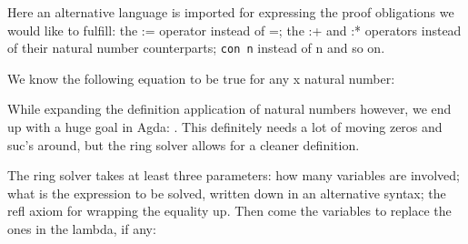 {Here an alternative language is imported for expressing the proof obligations we would like to fulfill: the := operator instead of =; the :+ and :* operators instead of their natural number counterparts; \texttt{con n} instead of n and so on.

We know the following equation to be true for any x natural number:

\begin{code}%
\>[0]\AgdaSpace{}%
\AgdaSymbol{:}\AgdaSpace{}%
\AgdaSymbol{(}\AgdaSpace{}%
\AgdaSymbol{:}\AgdaSpace{}%
\AgdaSymbol{)}\AgdaSpace{}%
\AgdaSpace{}%
\AgdaSymbol{(}\AgdaSpace{}%
\AgdaOperator{\AgdaPrimitive{*}}\AgdaSpace{}%
\AgdaSymbol{(}\AgdaSpace{}%
\AgdaOperator{\AgdaPrimitive{+}}\AgdaSpace{}%
\AgdaSymbol{)}\AgdaSpace{}%
\AgdaSpace{}%
\AgdaSpace{}%
\AgdaOperator{\AgdaPrimitive{+}}\AgdaSpace{}%
\AgdaSpace{}%
\AgdaOperator{\AgdaPrimitive{*}}\AgdaSpace{}%
\AgdaSymbol{)}\<%
\end{code}

While expanding the definition application of natural numbers however, we end up with a huge goal in Agda: . This definitely needs a lot of moving zeros and suc's around, but the ring solver allows for a cleaner definition.

The ring solver takes at least three parameters: how many variables are involved; what is the expression to be solved, written down in an alternative syntax; the refl axiom for wrapping the equality up. Then come the variables to replace the ones in the lambda, if any:
\begin{code}%
\>[0]\AgdaSpace{}%
\AgdaSymbol{=}\AgdaSpace{}%
\AgdaSpace{}%
\AgdaSpace{}%
\AgdaSpace{}%
\AgdaSpace{}%
\AgdaSpace{}%
\AgdaSpace{}%
\AgdaSpace{}%
\AgdaOperator{\AgdaFunction{:*}}\AgdaSpace{}%
\AgdaSymbol{(}\AgdaSpace{}%
\AgdaOperator{\AgdaFunction{:+}}\AgdaSpace{}%
\AgdaSpace{}%
\AgdaSymbol{)}\AgdaSpace{}%
\AgdaOperator{\AgdaFunction{:=}}\AgdaSpace{}%
\AgdaSpace{}%
\AgdaSpace{}%
\AgdaOperator{\AgdaFunction{:+}}\AgdaSpace{}%
\AgdaSpace{}%
\AgdaSpace{}%
\AgdaOperator{\AgdaFunction{:*}}\AgdaSpace{}%
\AgdaSymbol{)}\AgdaSpace{}%
\<%
\end{code}

}
